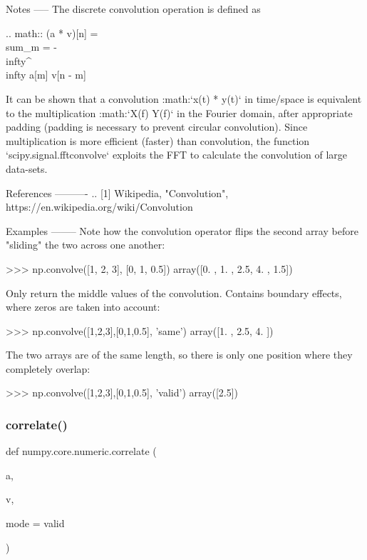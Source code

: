 \begin{DoxyVerb}
Notes
-----
The discrete convolution operation is defined as

.. math:: (a * v)[n] = \\sum_{m = -\\infty}^{\\infty} a[m] v[n - m]

It can be shown that a convolution :math:`x(t) * y(t)` in time/space
is equivalent to the multiplication :math:`X(f) Y(f)` in the Fourier
domain, after appropriate padding (padding is necessary to prevent
circular convolution).  Since multiplication is more efficient (faster)
than convolution, the function `scipy.signal.fftconvolve` exploits the
FFT to calculate the convolution of large data-sets.

References
----------
.. [1] Wikipedia, "Convolution",
    https://en.wikipedia.org/wiki/Convolution

Examples
--------
Note how the convolution operator flips the second array
before "sliding" the two across one another:

>>> np.convolve([1, 2, 3], [0, 1, 0.5])
array([0. , 1. , 2.5, 4. , 1.5])

Only return the middle values of the convolution.
Contains boundary effects, where zeros are taken
into account:

>>> np.convolve([1,2,3],[0,1,0.5], 'same')
array([1. ,  2.5,  4. ])

The two arrays are of the same length, so there
is only one position where they completely overlap:

>>> np.convolve([1,2,3],[0,1,0.5], 'valid')
array([2.5])\end{DoxyVerb}
 \mbox{\label{namespacenumpy_1_1core_1_1numeric_aadcf1c35df9b086c7f3dec19cc6c9579}} 
\subsubsection{\texorpdfstring{correlate()}{correlate()}}
{\footnotesize\ttfamily def numpy.\+core.\+numeric.\+correlate (\begin{DoxyParamCaption}\item[{}]{a,  }\item[{}]{v,  }\item[{}]{mode = {\ttfamily \textquotesingle{}valid\textquotesingle{}} }\end{DoxyParamCaption})}

